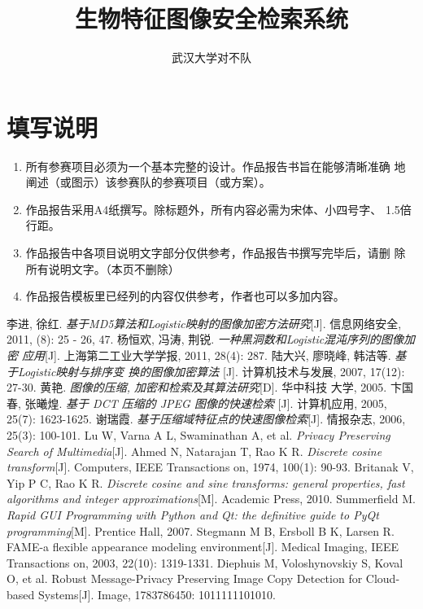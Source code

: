 \documentclass[utf8, 12pt, titlepage, a4paper]{ctexrep}
\author{武汉大学对不队}
\title{生物特征图像安全检索系统}
\begin{document}


\section*{填写说明}
\begin{enumerate}
\item 所有参赛项目必须为一个基本完整的设计。作品报告书旨在能够清晰准确
  地阐述（或图示）该参赛队的参赛项目（或方案）。
\item 作品报告采用A4纸撰写。除标题外，所有内容必需为宋体、小四号字、
  1.5倍行距。
\item 作品报告中各项目说明文字部分仅供参考，作品报告书撰写完毕后，请删
  除所有说明文字。（本页不删除）
\item 作品报告模板里已经列的内容仅供参考，作者也可以多加内容。
\end{enumerate}

\tableofcontents







\begin{thebibliography}{9}
 李进, 徐红.
 \emph{基于MD5算法和Logistic映射的图像加密方法研究}[J]. 信息网络安全,
 2011, (8): 25 - 26, 47.
 杨恒欢, 冯涛, 荆锐. \emph{一种黑洞数和Logistic混沌序列的图像加密
  应用}[J]. 上海第二工业大学学报, 2011, 28(4): 287.
 陆大兴, 廖晓峰, 韩洁等. \emph{基于Logistic映射与排序变
    换的图像加密算法}
[J]. 计算机技术与发展, 2007, 17(12): 27-30.
 黄艳. \emph{图像的压缩, 加密和检索及其算法研究}[D]. 华中科技
  大学, 2005.
 卞国春, 张曦煌. \emph{基于 DCT 压缩的 JPEG 图像的快速检索}
  [J]. 计算机应用, 2005, 25(7): 1623-1625.
 谢瑞霞. \emph{基于压缩域特征点的快速图像检索}[J]. 情报杂志,
  2006, 25(3): 100-101.
 Lu W, Varna A L, Swaminathan A, et al. \emph{Privacy
    Preserving Search of Multimedia}[J].
 Ahmed N, Natarajan T, Rao K R. \emph{Discrete cosine
    transform}[J]. Computers, IEEE Transactions on, 1974, 100(1):
  90-93.
 Britanak V, Yip P C, Rao K R. \emph{Discrete cosine and sine
  transforms: general properties, fast algorithms and integer
  approximations}[M]. Academic Press, 2010.
 Summerfield M. \emph{Rapid GUI Programming with Python
    and Qt: the definitive guide to PyQt programming}[M]. Prentice
  Hall, 2007.
 Stegmann M B, Ersboll B K, Larsen R. FAME-a flexible
  appearance modeling environment[J]. Medical Imaging, IEEE
  Transactions on, 2003, 22(10): 1319-1331.
 Diephuis M, Voloshynovskiy S, Koval O, et al. Robust
  Message-Privacy Preserving Image Copy Detection for Cloud-based
  Systems[J]. Image, 1783786450: 1011111101010.
\end{thebibliography}
\end{document}
